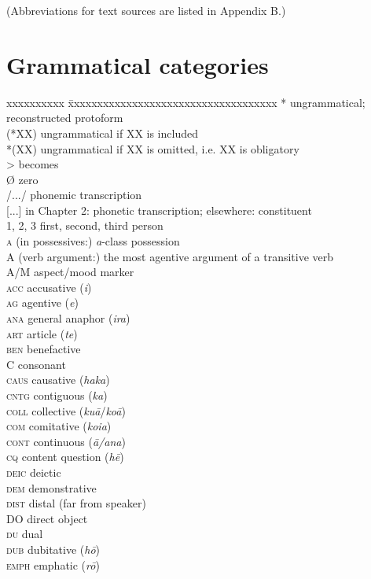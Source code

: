 

(Abbreviations for text sources are listed in Appendix B.)

\section*{Grammatical categories}

\begin{tabbing}
xxxxxxxxxx \= xxxxxxxxxxxxxxxxxxxxxxxxxxxxxxxxxxxx \kill
* \> ungrammatical; reconstructed protoform\\
(*XX) \> ungrammatical if XX is included\\
*(XX) \> ungrammatical if XX is omitted, i.e. XX is obligatory\\
{\textgreater} \> becomes\\
Ø \> zero\\
/.../ \> phonemic transcription\\
{[...]} \> in Chapter 2: phonetic transcription; elsewhere: constituent\\
1, 2, 3 \> first, second, third person\\
\textsc{a} \> (in possessives:) \textit{a}{}-class possession\\
A \> (verb argument:) the most agentive argument of a transitive verb\\
A/M \> aspect/mood marker\\
{\scshape acc} \> accusative (\textit{i})\\
{\scshape ag} \> agentive (\textit{e})\\
{\scshape ana} \> general anaphor (\textit{ira})\\
{\scshape art} \> article (\textit{te})\\
{\scshape ben} \> benefactive\\
{\scshape C} \> consonant\\
{\scshape caus} \> {causative (\textit{haka})}\\
{\scshape cntg} \> contiguous (\textit{ka})\\
{\scshape coll} \> collective (\textit{kuā}/\textit{koā})\\
{\scshape com} \> {comitative (\textit{koia})}\\
{\scshape cont} \> continuous (\textit{{\ꞌ}ā/{\ꞌ}ana})\\
{\scshape cq} \> content question (\textit{hē})\\
{\scshape deic} \> deictic\\
{\scshape dem} \> demonstrative\\
{\scshape dist} \> distal (far from speaker)\\
{\scshape DO} \> direct object\\
{\scshape du} \> dual\\
{\scshape dub} \> dubitative (\textit{hō})\\
{\scshape emph} \> emphatic (\textit{rō})\\


\end{tabbing}

